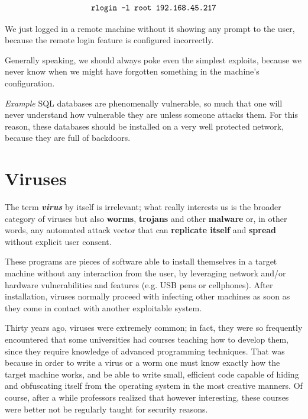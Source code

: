 \begin{align*}
\centering
\texttt{rlogin -l root 192.168.45.217}
\end{align*}
 
We just logged in a remote machine without it showing any prompt to the user, because the remote login feature is configured incorrectly.

Generally speaking, we should always poke even the simplest exploits, because we never know when we might have forgotten something in the machine’s configuration.

\vspace{0.5em}

\emph{Example} SQL databases are phenomenally vulnerable, so much that one will never understand how vulnerable they are unless someone attacks them. For this reason, these databases should be installed on a very well protected network, because they are full of backdoors.

\vspace{0.5em}


\section{Viruses}
The term \textbf{\textit{virus}} by itself is irrelevant; what really interests us is the broader category of viruses but also \textbf{worms}, \textbf{trojans} and other \textbf{malware} or, in other words, any automated attack vector that can \textbf{replicate itself} and \textbf{spread} without explicit user consent.

These programs are pieces of software able to install themselves in a target machine without any interaction from the user, by leveraging network and/or hardware vulnerabilities and features (e.g. USB pens or cellphones). After installation, viruses normally proceed with infecting other machines as soon as they come in contact with another exploitable system.

Thirty years ago, viruses were extremely common; in fact, they were so frequently encountered that some universities had courses teaching how to develop them, since they require knowledge of advanced programming techniques. That was because in order to write a virus or a worm one must know exactly how the target machine works, and be able to write small, efficient code capable of hiding and obfuscating itself from the operating system in the most creative manners. Of course, after a while professors realized that however interesting, these courses were better not be regularly taught for security reasons.

